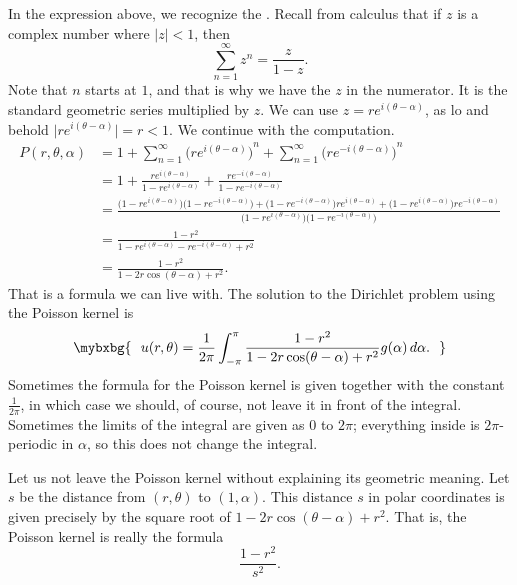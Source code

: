 In the expression above, we recognize the
\emph{}.
Recall from calculus that if $z$ is a complex number where $\lvert z \rvert < 1$, then
\begin{equation*}
\sum_{n=1}^\infty z^n = \frac{z}{1-z} .
\end{equation*}
Note that $n$ starts at $1$, and that is why we have the $z$ in the numerator.
It is the standard geometric series multiplied by $z$.
We can use $z = re^{i(\theta-\alpha)}$, as
lo and behold $\lvert re^{i(\theta-\alpha)} \rvert = r < 1$.
We continue with the computation.
\begin{equation*}
\begin{split}
P(r,\theta,\alpha)
& =
1
+
\sum_{n=1}^\infty
{\bigl(
re^{i(\theta-\alpha)}\bigr)}^{n}
+
\sum_{n=1}^\infty
{\bigl(
re^{-i(\theta-\alpha)}\bigr)}^{n}
\\
& =
1
+
\frac{re^{i(\theta-\alpha)}}{1-re^{i(\theta-\alpha)}}
+
\frac{re^{-i(\theta-\alpha)}}{1-re^{-i(\theta-\alpha)}}
\\
& = 
\frac{
\bigl(1-re^{i(\theta-\alpha)}\bigr)\bigl(1-re^{-i(\theta-\alpha)}\bigr)
+
\bigl(1-re^{-i(\theta-\alpha)}\bigr)re^{i(\theta-\alpha)} +
\bigl(1-re^{i(\theta-\alpha)}\bigr)re^{-i(\theta-\alpha)}}
{\bigl(1-re^{i(\theta-\alpha)}\bigr)\bigl(1-re^{-i(\theta-\alpha)}\bigr)}
\\
& = 
\frac{1 -r^2}{1 - re^{i(\theta-\alpha)} - re^{-i(\theta-\alpha)} +r^2}
\\
& = 
\frac{1 -r^2}{1 - 2r\cos(\theta-\alpha) +r^2} .
\end{split}
\end{equation*}
That is a formula we can live with.  The
solution to the Dirichlet problem using the Poisson kernel is
\begin{equation*}
\mybxbg{~~
u(r,\theta) = 
\frac{1}{2\pi} \int_{-\pi}^{\pi}
\frac{1 -r^2}{1 - 2r\cos(\theta-\alpha) +r^2} g(\alpha) \, d\alpha .
~~}
\end{equation*}
Sometimes the formula for the Poisson kernel is
given together with the constant $\frac{1}{2\pi}$, in which case we should,
of course, not leave it in front of the integral.
Sometimes the limits
of the integral are given as 0 to $2\pi$; everything inside is
$2\pi$-periodic in $\alpha$, so this does not change the integral.

\begin{mywrapfigsimp}[12]{2.1in}{2.4in}
\diffypdfversion{\vspace*{5pt}}
\noindent
{}
\end{mywrapfigsimp}
Let us not leave the Poisson kernel without explaining its geometric
meaning.  Let $s$ be the distance from $(r,\theta)$ to
$(1,\alpha)$.
This distance $s$ in polar coordinates is given precisely by the square root
of $1 - 2r\cos(\theta-\alpha) +r^2$.  That is, the Poisson kernel is really
the formula
\begin{equation*}
\frac{1-r^2}{s^2} .
\end{equation*}

